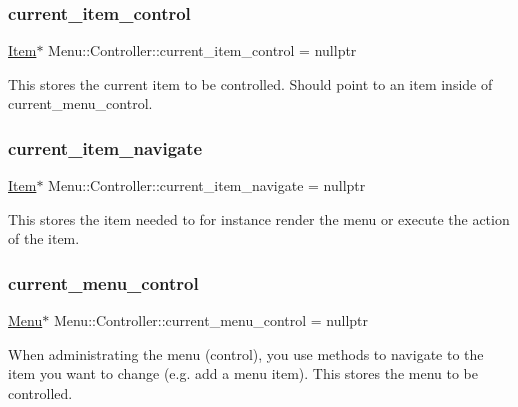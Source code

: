 \subsubsection{\texorpdfstring{current\+\_\+item\+\_\+control}{current\_item\_control}}
{\footnotesize\ttfamily \hyperlink{struct_menu_1_1_item}{Item}$\ast$ Menu\+::\+Controller\+::current\+\_\+item\+\_\+control = nullptr\hspace{0.3cm}{\ttfamily [private]}}

This stores the current item to be controlled. Should point to an item inside of current\+\_\+menu\+\_\+control. \hypertarget{class_menu_1_1_controller_a6dfb1678cc8fd44570806ff680ac27cf}{}\label{class_menu_1_1_controller_a6dfb1678cc8fd44570806ff680ac27cf} 
\subsubsection{\texorpdfstring{current\+\_\+item\+\_\+navigate}{current\_item\_navigate}}
{\footnotesize\ttfamily \hyperlink{struct_menu_1_1_item}{Item}$\ast$ Menu\+::\+Controller\+::current\+\_\+item\+\_\+navigate = nullptr\hspace{0.3cm}{\ttfamily [private]}}

This stores the item needed to for instance render the menu or execute the action of the item. \hypertarget{class_menu_1_1_controller_a912ad4ad6b2c30e7cddf44547585a909}{}\label{class_menu_1_1_controller_a912ad4ad6b2c30e7cddf44547585a909} 
\subsubsection{\texorpdfstring{current\+\_\+menu\+\_\+control}{current\_menu\_control}}
{\footnotesize\ttfamily \hyperlink{struct_menu_1_1_menu}{Menu}$\ast$ Menu\+::\+Controller\+::current\+\_\+menu\+\_\+control = nullptr\hspace{0.3cm}{\ttfamily [private]}}

When administrating the menu (control), you use methods to navigate to the item you want to change (e.\+g. add a menu item). This stores the menu to be controlled. \hypertarget{class_menu_1_1_controller_a66ffabf19a4423ccca536762f0b9df88}{}\label{class_menu_1_1_controller_a66ffabf19a4423ccca536762f0b9df88} 

